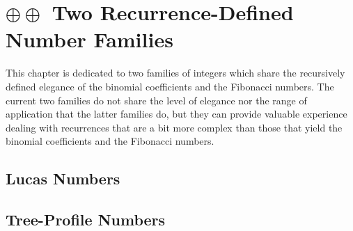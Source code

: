 
\chapter{$\oplus \oplus$ Two Recurrence-Defined Number Families}

\noindent {}

\bigskip

\noindent
This chapter is dedicated to two families of integers which share the recursively defined elegance of the binomial coefficients and the Fibonacci numbers.  The current two families do not share the level of elegance nor the range of application that the latter families do, but they can provide valuable experience dealing with recurrences that are a bit more complex than those that yield the binomial coefficients and the Fibonacci numbers.


\section{Lucas Numbers}
\label{sec:Lucas-numbers}




\section{Tree-Profile Numbers}
\label{sec:Tree-Profile-numbers}


